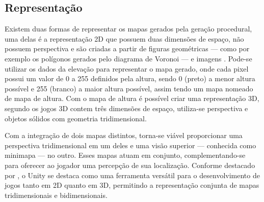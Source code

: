 \subsection{Representação}
\label{subsec:representacao}

Existem duas formas de representar os mapas gerados pela geração procedural, uma delas é a representação 2D que possuem duas dimensões de espaço, não possuem perspectiva e são criadas a partir de figuras geométricas — como por exemplo os polígonos gerados pelo diagrama de Voronoi — e imagens \cite{unitywebpage}. Pode-se utilizar os dados da elevação para representar o mapa gerado, onde cada pixel possui um valor de 0 a 255 definidos pela altura, sendo 0 (preto) a menor altura possível e 255 (branco) a maior altura possível, assim tendo um mapa nomeado de mapa de altura. Com o mapa de altura é possível criar uma representação 3D, segundo  os jogos 3D contem três dimensões de espaço, utiliza-se perspectiva e objetos sólidos com geometria tridimensional.

Com a integração de dois mapas distintos, torna-se viável proporcionar uma perspectiva tridimensional em um deles e uma visão superior — conhecida como minimapa — no outro. Esses mapas atuam em conjunto, complementando-se para oferecer ao jogador uma percepção de sua localização. Conforme destacado por , o Unity se destaca como uma ferramenta versátil para o desenvolvimento de jogos tanto em 2D quanto em 3D, permitindo a representação conjunta de mapas tridimensionais e bidimensionais.